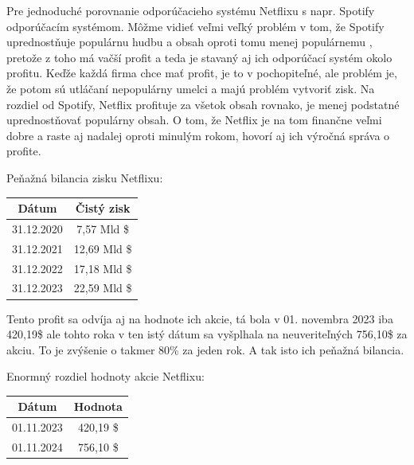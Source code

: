 \documentclass[10pt,twoside,slovak,a4paper]{article}
\begin{document}
Pre jednoduché porovnanie odporúčacieho systému Netflixu s napr. Spotify odporúčacím systémom. Môžme vidieť veľmi veľký problém v tom, že Spotify uprednostňuje populárnu hudbu a obsah oproti tomu menej populárnemu , pretože z toho má vačší profit a teda je stavaný aj ich odporúčací systém okolo profitu\cite{10425661}. Keďže každá firma chce mať profit, je to v pochopiteľné, ale problém je, že potom sú utláčaní nepopulárny umelci a majú problém vytvoriť zisk. Na rozdiel od Spotify, Netflix profituje za všetok obsah rovnako, je menej podstatné uprednostňovať populárny obsah. O tom, že Netflix je na tom finančne veľmi dobre a raste aj nadalej oproti minulým rokom, hovorí aj ich výročná správa o profite\cite{AnnualReportNetflix2023}.
\begin{center}
	Peňažná bilancia zisku Netflixu:
	\vspace{0.2cm}

	\begin{tabular}{||c | c||}
		\hline
		Dátum      & Čistý zisk   \\ [0.5ex]
		\hline\hline
		31.12.2020 & 7,57 Mld \$  \\
		\hline
		31.12.2021 & 12,69 Mld \$ \\
		\hline
		31.12.2022 & 17,18 Mld \$ \\
		\hline
		31.12.2023 & 22,59 Mld \$ \\
		\hline
	\end{tabular}
	\cite{AnnualReportsNetflix}
\end{center}
Tento profit sa odvíja aj na hodnote ich akcie, tá bola v 01. novembra 2023 iba 420,19\$ ale tohto roka v ten istý dátum sa vyšplhala na neuveriteľných 756,10\$ za akciu. To je zvýšenie o takmer 80\% za jeden rok.\cite{StockValueNetflix} A tak isto ich peňažná bilancia.

\begin{center}

	Enormný rozdiel hodnoty akcie Netflixu:

	\begin{tabular}{|c | c|}
		\hline
		Dátum      & Hodnota    \\ [0.5ex]
		\hline\hline
		01.11.2023 & 420,19  \$ \\
		\hline
		01.11.2024 & 756,10 \$  \\
		\hline
	\end{tabular}
	\cite{StockValueNetflix}
\end{center}
\end{document}
